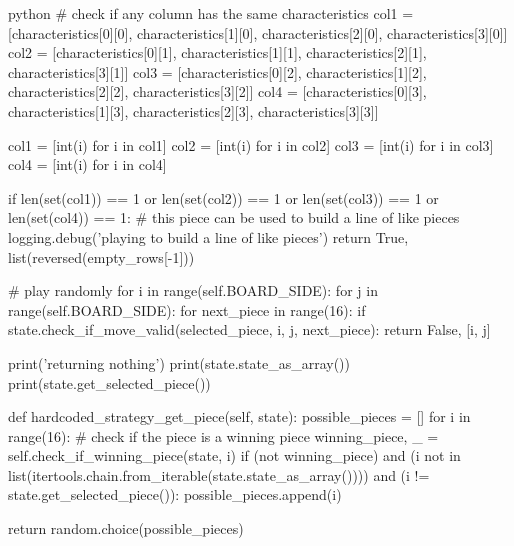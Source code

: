 \begin{mintedbox}{python}
                # check if any column has the same characteristics
                col1 = [characteristics[0][0], characteristics[1][0],
                        characteristics[2][0], characteristics[3][0]]
                col2 = [characteristics[0][1], characteristics[1][1],
                        characteristics[2][1], characteristics[3][1]]
                col3 = [characteristics[0][2], characteristics[1][2],
                        characteristics[2][2], characteristics[3][2]]
                col4 = [characteristics[0][3], characteristics[1][3],
                        characteristics[2][3], characteristics[3][3]]

                col1 = [int(i) for i in col1]
                col2 = [int(i) for i in col2]
                col3 = [int(i) for i in col3]
                col4 = [int(i) for i in col4]

                if len(set(col1)) == 1 or len(set(col2)) == 1 or len(set(col3)) == 1 or len(set(col4)) == 1:
                    # this piece can be used to build a line of like pieces
                    logging.debug('playing to build a line of like pieces')
                    return True, list(reversed(empty_rows[-1]))

        # play randomly
        for i in range(self.BOARD_SIDE):
            for j in range(self.BOARD_SIDE):
                for next_piece in range(16):
                    if state.check_if_move_valid(selected_piece, i, j, next_piece):
                        return False, [i, j]

        print('returning nothing')
        print(state.state_as_array())
        print(state.get_selected_piece())

    def hardcoded_strategy_get_piece(self, state):
        possible_pieces = []
        for i in range(16):
            # check if the piece is a winning piece
            winning_piece, _ = self.check_if_winning_piece(state, i)
            if (not winning_piece) and (i not in list(itertools.chain.from_iterable(state.state_as_array()))) and (i != state.get_selected_piece()):
                possible_pieces.append(i)

        return random.choice(possible_pieces)


\end{mintedbox}
